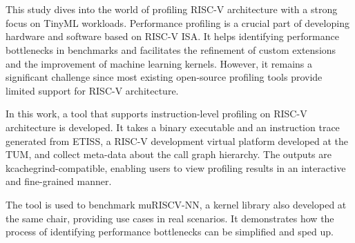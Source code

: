 \chapter{\abstractname}

This study dives into the world of profiling RISC-V architecture with a strong focus on \ac{TinyML} workloads. Performance profiling is a crucial part of developing hardware and software based on RISC-V \ac{ISA}. It helps identifying performance bottlenecks in benchmarks and facilitates the refinement of custom extensions and the improvement of machine learning kernels. However, it remains a significant challenge since most existing open-source profiling tools provide limited support for RISC-V architecture.


In this work, a tool that supports instruction-level profiling on RISC-V architecture is developed. It takes a binary executable and an instruction trace generated from \ac{ETISS}, a RISC-V development
virtual platform developed at the \ac{TUM}, and collect meta-data about the call graph hierarchy. The outputs are kcachegrind-compatible, enabling users to view profiling results in an interactive and fine-grained manner.


The tool is used to benchmark muRISCV-NN, a kernel library also developed at the same chair, providing use cases in real scenarios. It demonstrates how the process of identifying performance bottlenecks can be simplified and sped up.